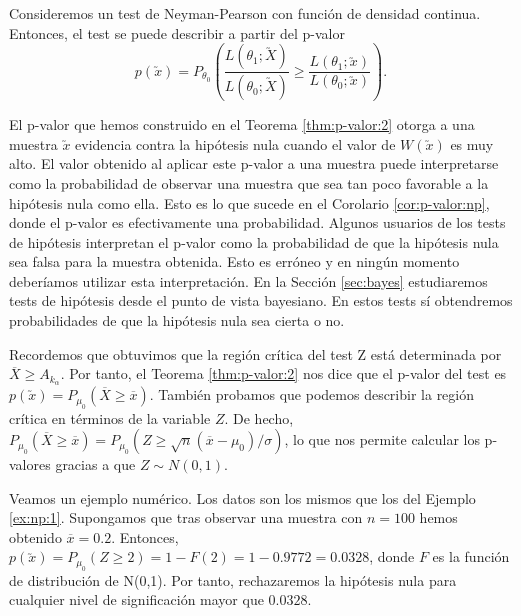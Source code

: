         \begin{cor} \label{cor:p-valor:np}
            Consideremos un test de Neyman-Pearson con función de densidad continua. Entonces, el test se puede describir a partir del p-valor
           \[p(\utilde{x}) = P_{\theta_0}\left(\frac{L(\theta_1;\utilde{X})}{L(\theta_0;\utilde{X})} \ge \frac{L(\theta_1;\utilde{x})}{L(\theta_0;\utilde{x})}\right).  \]
       \end{cor}

        El p-valor que hemos construido en el Teorema \ref{thm:p-valor:2} otorga a una muestra $\utilde{x}$ evidencia contra la hipótesis nula cuando el valor de $W(\utilde{x})$ es muy alto. El valor obtenido al aplicar este p-valor a una muestra puede interpretarse como la probabilidad de observar una muestra que sea tan poco favorable a la hipótesis nula como ella. Esto es lo que sucede en el Corolario \ref{cor:p-valor:np}, donde el p-valor es efectivamente una probabilidad. Algunos usuarios de los tests de hipótesis interpretan el p-valor como la probabilidad de que la hipótesis nula sea falsa para la muestra obtenida. Esto es erróneo y en ningún momento deberíamos utilizar esta interpretación. En la Sección \ref{sec:bayes} estudiaremos tests de hipótesis desde el punto de vista bayesiano. En estos tests sí obtendremos probabilidades de que la hipótesis nula sea cierta o no.

        \begin{ex}
            Recordemos que obtuvimos que la región crítica del test Z está determinada por $\overline{X} \ge A_{k_\alpha}$. Por tanto, el Teorema \ref{thm:p-valor:2} nos dice que el p-valor del test es $p(\utilde{x}) = P_{\mu_0}(\overline{X} \ge \overline{x})$. También probamos que podemos describir la región crítica en términos de la variable $Z$. De hecho, $P_{\mu_0}(\overline{X} \ge \overline{x}) = P_{\mu_0}(Z \ge \sqrt{n}(\overline{x} - \mu_0)/\sigma)$, lo que nos permite calcular los p-valores gracias a que $Z \sim N(0,1)$.

            Veamos un ejemplo numérico. Los datos son los mismos que los del Ejemplo \ref{ex:np:1}. Supongamos que tras observar una muestra con $n = 100$ hemos obtenido $\overline{x} = 0.2$. Entonces, $p(\utilde{x}) = P_{\mu_0}(Z \ge 2) = 1 - F(2) = 1 - 0.9772 = 0.0328$, donde $F$ es la función de distribución de N(0,1). Por tanto, rechazaremos la hipótesis nula para cualquier nivel de significación mayor que $0.0328$.
        \end{ex}

